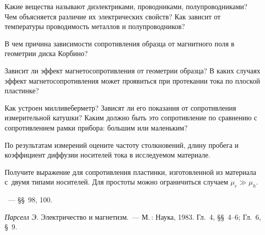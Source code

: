 \begin{lab:questions}

\item Какие вещества называют диэлектриками, проводниками, полупроводниками?
Чем объясняется различие их электрических свойств? Как зависит от температуры
проводимость металлов и полупроводников?

\item В чем причина зависимости сопротивления образца от магнитного
поля в геометрии диска Корбино?

\item Зависит ли эффект магнетосопротивления от геометрии образца? 
В каких случаях эффект магнетосопротивления может проявиться
при протекании тока по плоской пластинке?

\item Как устроен милливеберметр? Зависят ли его показания от сопротивления
измерительной катушки? Каким должно быть это сопротивление по сравнению с
сопротивлением рамки прибора: большим или маленьким?

\item По результатам измерений оцените частоту столкновений,
длину пробега и коэффициент диффузии носителей тока в исследуемом материале.

\item Получите выражение для сопротивления пластинки, изготовленной
из материала с~двумя типами носителей. 
Для простоты можно ограничиться случаем $\mu_e \gg \mu_h$.

\end{lab:questions}


\begin{lab:literature}
\item \SivuhinIII~--- \S\S~98, 100.
\item \textit{Парселл Э.} Электричество и магнетизм.~--- М.\,: Наука, 1983. Гл.~4,
\S\S~4--6; Гл.~6, \S~9.
\end{lab:literature}

